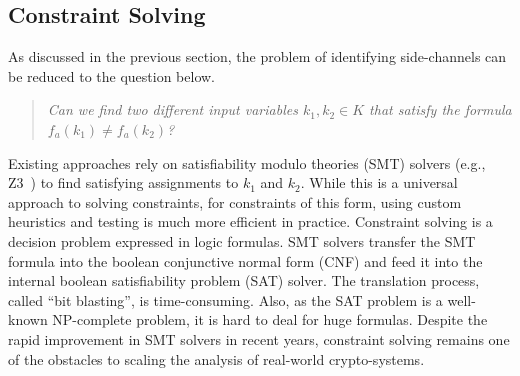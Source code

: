 \begin{table}[ht]
  \centering\small\footnotesize
  \caption{The number of x86,  %
    REIL IR, and VEX IR instructions on the traces of crypto programs.}
  \label{scala:ir}
\end{table}

\subsection{Constraint Solving}
As discussed in the previous section, the problem of identifying
side-channels can be reduced to the question below.

\begin{quote}
  \textit{Can we find two different input variables $k_1, k_2 \in K$ that
    satisfy the formula $f_a(k_1) \neq f_a(k_2)$?}
\end{quote}

Existing approaches rely on satisfiability modulo theories (SMT) solvers
(e.g., Z3~\cite{DeMoura:2008:ZES:1792734.1792766}) to find satisfying assignments to
$k_1$ and $k_2$.
While this is a universal approach to solving constraints,
for constraints of this form, using custom
heuristics and testing is much more efficient in practice. Constraint
solving is a decision problem expressed in logic formulas. SMT solvers
transfer the SMT formula into the boolean conjunctive normal
form (CNF) and feed it into the internal boolean satisfiability
problem (SAT) solver. The translation process, called ``bit blasting'',
is time-consuming. Also, as the SAT problem is a well-known NP-complete
problem, it is hard to deal for huge formulas. Despite the rapid improvement
in SMT solvers in recent years, constraint solving remains one of
the obstacles to scaling the analysis of real-world crypto-systems.

